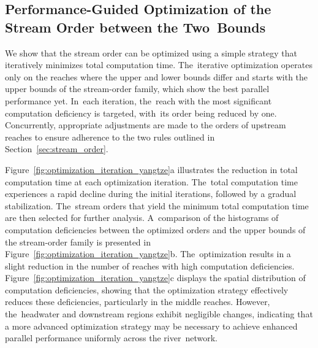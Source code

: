 \documentclass[water,article,accept,pdftex,moreauthors]{Definitions/mdpi}
\begin{document}
\subsection{Performance-Guided Optimization of the Stream Order between the Two~Bounds}
\label{sec:optimization_yangtze}

We show that the stream order can be optimized using a simple strategy that iteratively minimizes total computation time. The~iterative optimization operates only on the reaches where the upper and lower bounds differ and starts with the upper bounds of the stream-order family, which show the best parallel performance yet. In~each iteration, the~reach with the most significant computation deficiency is targeted, with~its order being reduced by one. Concurrently, appropriate adjustments are made to the orders of upstream reaches to ensure adherence to the two rules outlined in Section~\ref{sec:stream_order}.

Figure~\ref{fig:optimization_iteration_yangtze}a illustrates the reduction in total computation time at each optimization iteration. The~total computation time experiences a rapid decline during the initial iterations, followed by a gradual stabilization. The~stream orders that yield the minimum total computation time are then selected for further analysis. A~comparison of the histograms of computation deficiencies between the optimized orders and the upper bounds of the stream-order family is presented in Figure~\ref{fig:optimization_iteration_yangtze}b. The~optimization results in a slight reduction in the number of reaches with high computation deficiencies. Figure~\ref{fig:optimization_iteration_yangtze}c displays the spatial distribution of computation deficiencies, showing that the optimization strategy effectively reduces these deficiencies, particularly in the middle reaches. However, the~headwater and downstream regions exhibit negligible changes, indicating that a more advanced optimization strategy may be necessary to achieve enhanced parallel performance uniformly across the river~network.
\end{document}
